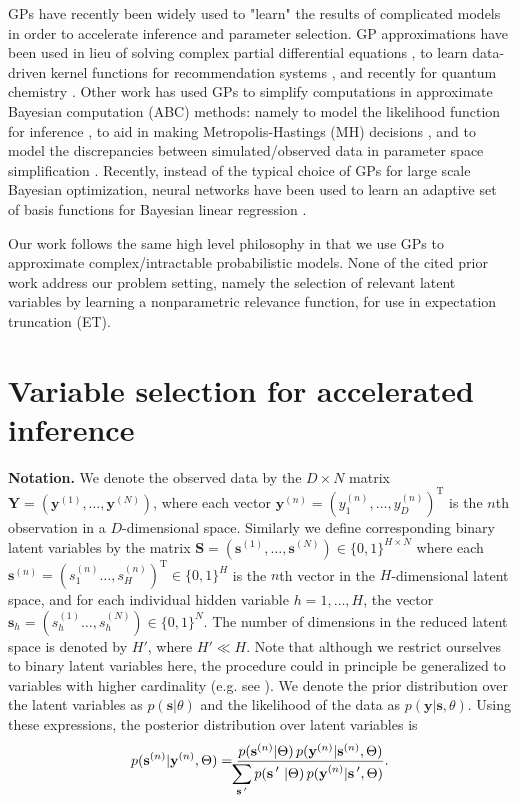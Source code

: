 \documentclass[12pt]{article}
\newcommand{\disS}{\displaystyle}
\newcommand{\Prime}{\,'}  %
\renewcommand{\vec}[1]{{\mathbf{#1}}}
\begin{document}
 
GPs have recently been widely used to "learn" the results of complicated models in order to accelerate inference and parameter selection. 
GP approximations have been used in lieu of solving complex partial differential equations \citep{SacksEtal1989, CurrinEtall1991}, to learn data-driven kernel functions for recommendation systems \citep{SchwaighoferEtAl2005}, and recently for quantum chemistry \citep{RuppEtAl2012}. 
Other work has used GPs to simplify computations in approximate Bayesian computation (ABC) methods: namely to model the likelihood function for inference \citep{Wilkinsons2014}, to aid in making Metropolis-Hastings (MH) decisions \citep{MeedsWelling2014}, and to model the discrepancies between simulated/observed data in parameter space simplification \citep{GuttmanCorander2015}.
Recently, instead of the typical choice of GPs for large scale Bayesian optimization, neural networks have been used to learn an adaptive set of basis functions for Bayesian linear regression \citep{SnoekEtAl2015}.


Our work follows the same high level philosophy in that we use GPs to approximate complex/intractable probabilistic models. None of the cited prior work address our problem setting, namely the selection of relevant latent variables by learning a nonparametric relevance function, for use in expectation truncation (ET).

\section{Variable selection for accelerated inference}
\label{method}
\textbf{Notation.}
We denote the observed data by the $D\times N$ matrix $\vec{Y}=(\vec{y}^{(1)}, \dots, \vec{y}^{(N)})$, where each vector $\vec{y}^{(n)} = ( y_1^{(n)}, \dots, y_D^{(n)})^\mathrm{T}$ is the $n$th observation 
in a $D$-dimensional space.
Similarly we define corresponding 
binary latent variables 
by the matrix $\vec{S} = (\vec{s}^{(1)}, \dots, \vec{s}^{(N)})\in \{0,1\}^{H \times N}$ 
where each $\vec{s}^{(n)}=(s_1^{(n)}\dots, s^{(n)}_H)^\mathrm{T} \in \{0,1\}^{H}$ is the $n$th vector in the $H$-dimensional latent space,
and for each individual hidden variable $h=1,\dots,H$, the vector $\vec{s}_h=(s_h^{(1)}\dots, s^{(N)}_h)\in \{0,1\}^{N}$. 
The number of dimensions in the reduced latent space is denoted by $H'$, where $H' \ll H$. 
Note that although we restrict ourselves to binary latent variables here, 
the procedure could in principle be generalized to variables with higher cardinality (e.g. see \citep{ExarchakisEtAl2012}).
We denote the prior distribution over the latent variables as $p(\vec{s} | \theta)$ 
and the likelihood of the data as $p(\vec{y} | \vec{s}, \theta)$.
Using these expressions, the posterior distribution over latent variables is 
%
\vspace{-.1cm}
\begin{equation}
\label{eq:post}
p(\vec{s}^{(n)}|\vec{y}^{(n)},\Theta)  = \frac{p(\vec{s}^{(n)} | \Theta) \, p(\vec{y}^{(n)} | \vec{s}^{(n)}, \Theta)}
{\disS\hspace{-1.5mm}\sum_{\vec{s}\Prime} p(\vec{s}\Prime\ | \Theta) \, p(\vec{y}^{(n)} | \vec{s}\Prime, \Theta)}.
\end{equation}
\vspace{-.5cm}
\end{document}
